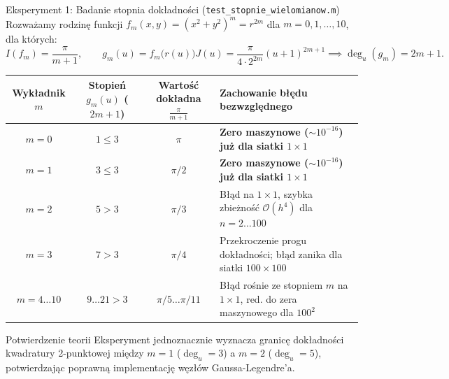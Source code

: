 \documentclass[aspectratio=169, 10pt, xcolor={table}]{beamer}
\begin{document}
\begin{frame}{Eksperyment 1: Badanie stopnia dokładności (\texttt{test\_stopnie\_wielomianow.m})}
  Rozważamy rodzinę funkcji $f_m(x,y) = (x^2 + y^2)^m = r^{2m}$ dla $m = 0, 1, \dots, 10$, dla których:
  \[
    I(f_m) = \frac{\pi}{m + 1}, \qquad g_m(u) = f_m\big(r(u)\big)J(u) = \frac{\pi}{4 \cdot 2^{2m}}(u+1)^{2m+1} \implies \deg_u(g_m) = 2m + 1.
  \]

  \begin{table}
    \centering
    \small
    \begin{tabular}{@{} c c c l @{}}
      \toprule
      \textbf{Wykładnik $m$} & \textbf{Stopień $g_m(u)$ ($2m+1$)} & \textbf{Wartość dokładna $\frac{\pi}{m+1}$} & \textbf{Zachowanie błędu bezwzględnego} \\
      \midrule
      \rowcolor{RowHighlight}
      $m = 0$ & $1 \le 3$ & $\pi$ & \textbf{Zero maszynowe ($\sim 10^{-16}$) już dla siatki $1 \times 1$} \\
      \rowcolor{RowHighlight}
      $m = 1$ & $3 \le 3$ & $\pi / 2$ & \textbf{Zero maszynowe ($\sim 10^{-16}$) już dla siatki $1 \times 1$} \\
      $m = 2$ & $5 > 3$ & $\pi / 3$ & Błąd na $1 \times 1$, szybka zbieżność $\mathcal{O}(h^4)$ dla $n = 2 \dots 100$ \\
      $m = 3$ & $7 > 3$ & $\pi / 4$ & Przekroczenie progu dokładności; błąd zanika dla siatki $100 \times 100$ \\
      $m = 4 \dots 10$ & $9 \dots 21 > 3$ & $\pi/5 \dots \pi/11$ & Błąd rośnie ze stopniem $m$ na $1\times 1$, red. do zera maszynowego dla $100^2$ \\
      \bottomrule
    \end{tabular}
  \end{table}

  \begin{exampleblock}{Potwierdzenie teorii}
    Eksperyment jednoznacznie wyznacza granicę dokładności kwadratury 2-punktowej między $m = 1$ ($\deg_u = 3$) a $m = 2$ ($\deg_u = 5$), potwierdzając poprawną implementację węzłów Gaussa-Legendre'a.
  \end{exampleblock}
\end{frame}
\end{document}
